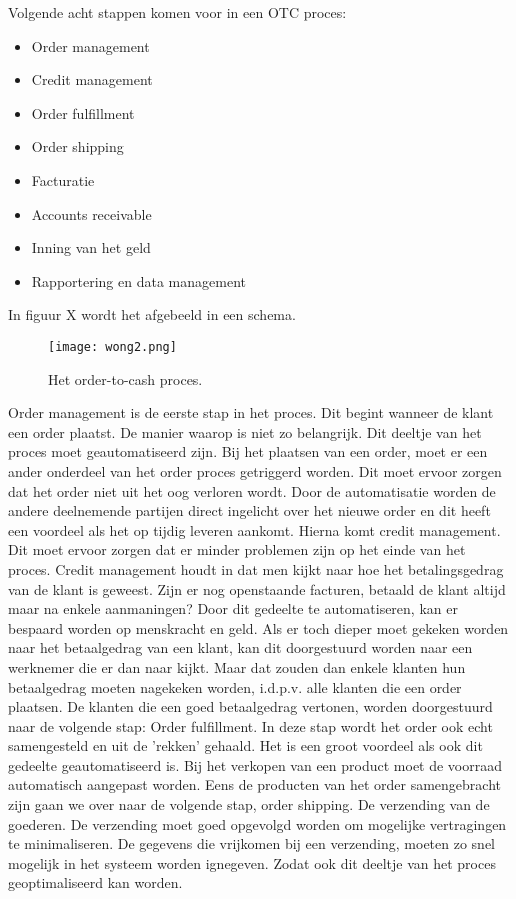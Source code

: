 Volgende acht stappen komen voor in een OTC proces:
\begin{itemize}
	\item Order management
	\item Credit management
	\item Order fulfillment
	\item Order shipping
	\item Facturatie
	\item Accounts receivable
	\item Inning van het geld
	\item Rapportering en data management
\end{itemize}
In figuur X wordt het afgebeeld in een schema.
\begin{figure}[h]
	\texttt{[image: wong2.png]}
	\caption{Het order-to-cash proces. \textcite{Wong2018}}
	\centering
\end{figure}
Order management is de eerste stap in het proces. Dit begint wanneer de klant een order plaatst. De manier waarop is niet zo belangrijk. Dit deeltje van het proces moet geautomatiseerd zijn. Bij het plaatsen van een order, moet er een ander onderdeel van het order proces getriggerd worden. Dit moet ervoor zorgen dat het order niet uit het oog verloren wordt. Door de automatisatie worden de andere deelnemende partijen direct ingelicht over het nieuwe order en dit heeft een voordeel als het op tijdig leveren aankomt.
Hierna komt credit management. Dit moet ervoor zorgen dat er minder problemen zijn op het einde van het proces. Credit management houdt in dat men kijkt naar hoe het betalingsgedrag van de klant is geweest. Zijn er nog openstaande facturen, betaald de klant altijd maar na enkele aanmaningen? Door dit gedeelte te automatiseren, kan er bespaard worden op menskracht en geld. Als er toch dieper moet gekeken worden naar het betaalgedrag van een klant, kan dit doorgestuurd worden naar een werknemer die er dan naar kijkt. Maar dat zouden dan enkele klanten hun betaalgedrag moeten nagekeken worden, i.d.p.v. alle klanten die een order plaatsen. 
De klanten die een goed betaalgedrag vertonen, worden doorgestuurd naar de volgende stap: Order fulfillment. In deze stap wordt het order ook echt samengesteld en uit de 'rekken' gehaald. Het is een groot voordeel als ook dit gedeelte geautomatiseerd is. Bij het verkopen van een product moet de voorraad automatisch aangepast worden. Eens de producten van het order samengebracht zijn gaan we over naar de volgende stap, order shipping. De verzending van de goederen. De verzending moet goed opgevolgd worden om mogelijke vertragingen te minimaliseren. De gegevens die vrijkomen bij een verzending, moeten zo snel mogelijk in het systeem worden ignegeven. Zodat ook dit deeltje van het proces geoptimaliseerd kan worden. 
